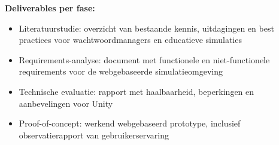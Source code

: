 \textbf{Deliverables per fase:}
\begin{itemize}
    \item Literatuurstudie: overzicht van bestaande kennis, uitdagingen en best practices voor wachtwoordmanagers en educatieve simulaties
    \item Requirements-analyse: document met functionele en niet-functionele requirements voor de webgebaseerde simulatieomgeving
    \item Technische evaluatie: rapport met haalbaarheid, beperkingen en aanbevelingen voor Unity 
    \item Proof-of-concept: werkend webgebaseerd prototype, inclusief observatierapport van gebruikerservaring
\end{itemize}



